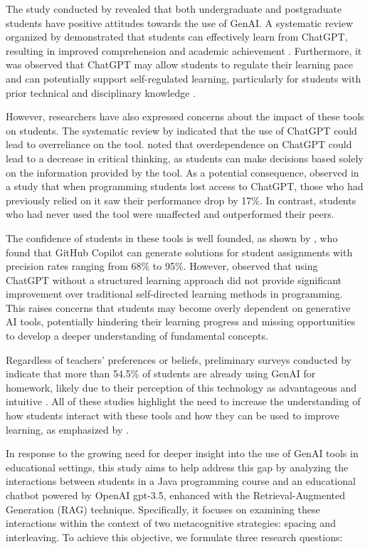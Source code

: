 \documentclass[a4paper,twoside]{article}
\begin{document}
The study conducted by \cite{chan23} revealed that both undergraduate and
postgraduate students have positive attitudes towards the use of GenAI.
A systematic review organized by \cite{Lo24} demonstrated that students can
effectively learn from ChatGPT, resulting in improved comprehension and academic
achievement \citep{Callejo24}. Furthermore, it was observed that ChatGPT may
allow students to regulate their learning pace \citep{Baha24} and can
potentially support self-regulated learning, particularly for students with
prior technical and disciplinary knowledge \citep{Xia23}.

However, researchers have also expressed concerns about the impact of these
tools on students. The systematic review by \cite{Murillo23} indicated that the
use of ChatGPT could lead to overreliance on the tool. \cite{chan23} noted that
overdependence on ChatGPT could lead to a decrease in critical thinking, as
students can make decisions based solely on the information provided by the
tool. As a potential consequence, \cite{Bastani24} observed in a study that when
programming students lost access to ChatGPT, those who had previously relied
on it saw their performance drop by 17\%. In contrast, students who had never
used the tool were unaffected and outperformed their peers.

The confidence of students in these tools is well founded, as shown by
\cite{Puryear22}, who found that GitHub Copilot can generate solutions for
student assignments with precision rates ranging from 68\% to 95\%. However,
\cite{Boudouaia24} observed that using ChatGPT without a structured learning
approach did not provide significant improvement over traditional self-directed
learning methods in programming. This raises concerns that students may become
overly dependent on generative AI tools, potentially hindering their learning
progress and missing opportunities to develop a deeper understanding of
fundamental concepts.

Regardless of teachers' preferences or beliefs, preliminary surveys conducted
by \cite{Dickey24} indicate that more than 54.5\% of students are already using
GenAI for homework, likely due to their perception of this technology as
advantageous and intuitive \citep{Boudouaia24}. All of these studies highlight
the need to increase the understanding of how students interact with these tools
and how they can be used to improve learning, as emphasized by \cite{Lo24}.

In response to the growing need for deeper insight into the use of GenAI tools
in educational settings, this study aims to help address this gap by analyzing
the interactions between students in a Java programming course and an
educational chatbot powered by OpenAI gpt-3.5, enhanced with the
Retrieval-Augmented Generation (RAG) technique. Specifically, it focuses on
examining these interactions within the context of two metacognitive strategies:
spacing and interleaving. To achieve this objective, we formulate three research
questions:
\end{document}
